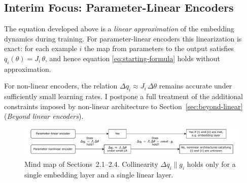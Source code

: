 \subsection{Interim Focus: Parameter-Linear Encoders}

The equation developed above is a \emph{linear approximation} of the embedding dynamics during training. For parameter-linear encoders this linearization is exact: for each example $i$ the map from parameters to the output satisfies $q_i(\theta)=J_i\,\theta$, and hence equation \eqref{eq:starting-formula} holds without approximation.

For non-linear encoders, the relation $\Delta q_i \approx J_i\,\Delta\theta$ remains accurate under sufficiently small learning rates. I postpone a full treatment of the additional constraints imposed by non-linear architecture to Section~\ref{sec:beyond-linear} (\emph{Beyond linear encoders}).

\begin{figure}[t]
\includegraphics[width=\textwidth]{../draft_materials/figure_1_paper.pdf}
\caption{Mind map of Sections~2.1--2.4. Collinearity $\Delta q_i \parallel g_i$ holds only for a single embedding layer and a single linear layer.}
\label{fig:sec2-mindmap}
\end{figure}